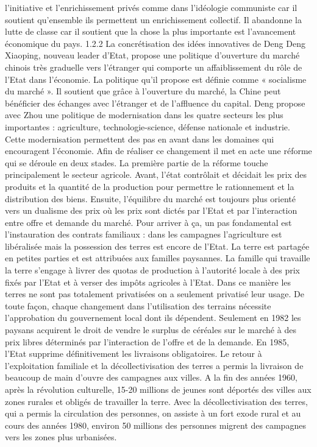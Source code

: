l’initiative et l’enrichissement privés comme dans l’idéologie communiste car il soutient qu’ensemble ils permettent un enrichissement collectif. Il abandonne la lutte de classe car il soutient que la chose la plus importante est l’avancement économique du pays.
1.2.2 La concrétisation des idées innovatives de Deng
Deng Xiaoping, nouveau leader d’Etat, propose une politique d’ouverture du marché chinois très graduelle vers l’étranger qui comporte un affaiblissement du rôle de l’Etat dans l’économie.   La politique qu’il propose est définie comme « socialisme du marché ».  Il soutient que grâce à l’ouverture du marché, la Chine peut bénéficier des échanges avec l’étranger et de l’affluence du capital. Deng propose avec Zhou une politique de modernisation dans les quatre secteurs les plus importantes : agriculture, technologie-science, défense nationale et industrie.  Cette modernisation permettent des pas en avant dans les domaines qui encouragent l’économie.
Afin de réaliser ce changement il met en acte une réforme qui se déroule en deux stades. La première partie de la réforme touche principalement le secteur agricole. Avant, l’état contrôlait et décidait les prix des produits et la quantité de la production pour permettre le rationnement et la distribution des biens. Ensuite, l’équilibre du marché est toujours plus orienté vers un dualisme des prix où les prix sont dictés par l’Etat et par l’interaction entre offre et demande du marché.  Pour arriver à ça, un pas fondamental est l’instauration des contrats familiaux : dans les campagnes l’agriculture est libéralisée mais la possession des terres est encore de l’Etat. La terre est partagée en petites parties et est attribuées aux familles paysannes. La famille qui travaille la terre s’engage à livrer des quotas de production à l’autorité locale à des prix fixés par l’Etat et à verser des impôts agricoles à l’Etat. Dans ce manière les terres ne sont pas totalement privatisées on a seulement privatisé leur usage.  De toute façon, chaque changement dans l'utilisation des terrains nécessite l'approbation du gouvernement local dont ils dépendent. Seulement en 1982 les paysans acquirent le droit de vendre le surplus de céréales sur le marché à des prix libres déterminés par l'interaction de l'offre et de la demande. En 1985, l'Etat supprime définitivement les livraisons obligatoires.  Le retour à l’exploitation familiale et la décollectivisation des terres a permis la livraison de beaucoup de main d’ouvre des campagnes aux villes.  A la fin des années 1960, après la révolution culturelle, 15-20 millions de jeunes sont déportés des villes aux zones rurales et obligés de travailler la terre.  Avec la décollectivisation des terres, qui a permis la circulation des personnes, on assiste à un fort exode rural et au cours des années 1980, environ 50 millions des personnes migrent des campagnes vers les zones plus urbanisées. 
